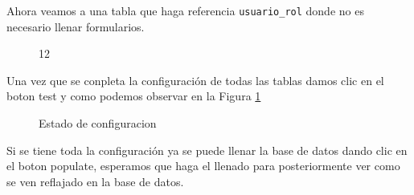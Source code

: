 Ahora veamos a una tabla que haga referencia \texttt{usuario\_rol} donde no es necesario llenar formularios.
\begin{figure}[H]
\caption{12}
\centering
{}
\end{figure}
Una vez que se conpleta la configuraci\'on de todas las tablas damos clic en el boton test y como podemos observar en la Figura \ref{fig:statusConnection}
\begin{figure}[H]
\caption{Estado de configuracion}\label{fig:statusConnection}
\centering
{}
\end{figure}
 Si se tiene toda la configuraci\'on ya se puede llenar la base de datos dando clic en el boton populate, esperamos que haga el llenado para posteriormente ver como se ven reflajado en la base de datos.
 
